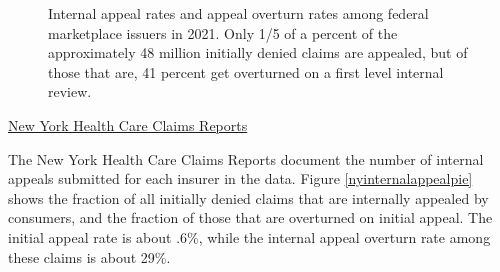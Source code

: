 \documentclass[12pt, a4paper,twoside]{report}
\theoremstyle{plain} %
\theoremstyle{definition} %
\theoremstyle{remark} %
\numberwithin{equation}{chapter}
\begin{document}
\begin{figure}[h!]
\begin{subfigure}[b]{0.49\textwidth}
		\end{subfigure}
		\caption{Internal appeal rates and appeal overturn rates among federal marketplace issuers in 2021. Only 1/5 of a percent of the approximately 48 million initially denied claims are appealed, but of those that are, 41 percent get overturned on a first level internal review.}
		\label{federalinternalappealpie}
	\end{figure}
	
		\clearpage
	
		\underline{New York Health Care Claims Reports}
		
		The New York Health Care Claims Reports document the number of internal appeals submitted for each insurer in the data. Figure \ref{nyinternalappealpie} shows the fraction of all initially denied claims that are internally appealed by consumers, and the fraction of those that are overturned on initial appeal. The initial appeal rate is about .6\%, while the internal appeal overturn rate among these claims is about 29\%.
		
\end{document}
